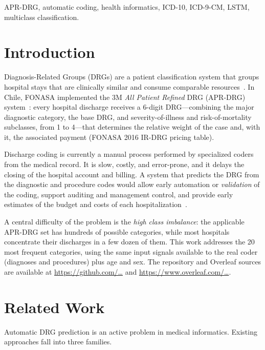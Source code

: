 \documentclass{ieeeaccess}
\begin{document}
\begin{keywords}
APR-DRG, automatic coding, health informatics, ICD-10, ICD-9-CM, LSTM, multiclass classification.
\end{keywords}

\titlepgskip=-21pt

\maketitle

\section{Introduction}
\label{sec:introduction}
 Diagnosis-Related Groups (DRGs) are a patient classification system that groups hospital stays that are clinically similar and consume comparable resources~\cite{b1}. In Chile, FONASA implemented the 3M \emph{All Patient Refined} DRG (APR-DRG) system~\cite{b2}: every hospital discharge receives a 6-digit DRG---combining the major diagnostic category, the base DRG, and severity-of-illness and risk-of-mortality subclasses, from 1 to 4---that determines the relative weight of the case and, with it, the associated payment (FONASA 2016 IR-DRG pricing table).

Discharge coding is currently a manual process performed by specialized coders from the medical record. It is slow, costly, and error-prone, and it delays the closing of the hospital account and billing. A system that predicts the DRG from the diagnostic and procedure codes would allow early automation or \emph{validation} of the coding, support auditing and management control, and provide early estimates of the budget and costs of each hospitalization~\cite{b3}.

A central difficulty of the problem is the \emph{high class imbalance}: the applicable APR-DRG set has hundreds of possible categories, while most hospitals concentrate their discharges in a few dozen of them. This work addresses the 20 most frequent categories, using the same input signals available to the real coder (diagnoses and procedures) plus age and sex. The repository and Overleaf sources are available at \underline{https://github.com/\ldots} and \underline{https://www.overleaf.com/\ldots}.

\section{Related Work}
\label{sec:related}
Automatic DRG prediction is an active problem in medical informatics. Existing approaches fall into three families.
\end{document}
